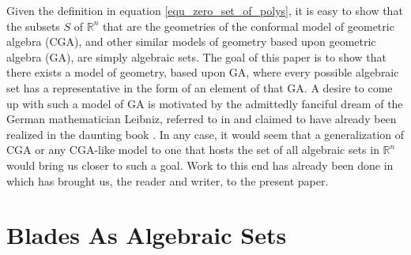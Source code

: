 \documentclass{birkjour}
\theoremstyle{definition}
\theoremstyle{remark}
\numberwithin{equation}{section}
\newcommand{\R}{\mathbb{R}}
\begin{document}
Given the definition in equation \eqref{equ_zero_set_of_polys}, it is easy to show that
the subsets $S$ of $\R^n$ that are the geometries of the conformal model of geometric algebra
(CGA), and other similar models of geometry based upon geometric algebra (GA), are simply algebraic sets.
The goal of this paper is to show that there exists a model of geometry, based upon GA,
where every possible algebraic set has a representative in the form of an element of that GA.
A desire to come up with such a model of GA is motivated by the admittedly fanciful
dream of the German mathematician Leibniz, referred to in \cite{} and claimed to
have already been realized in the daunting book \cite{}.  In any case, it would seem that a generalization
of CGA or any CGA-like model to one that hosts the set of all algebraic sets in $\R^n$ would bring
us closer to such a goal.  Work to this end has already been done in \cite{Parkin13a,Parkin13b} which
has brought us, the reader and writer, to the present paper.

\section{Blades As Algebraic Sets}
\end{document}
